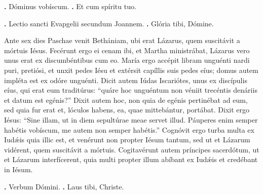 
\textbf{\Vbar.} Dóminus vobíscum.
\textbf{\Rbar.} Et cum spíritu tuo.

\textbf{\Vbar.} Lectio sancti Evapgelii secundum Joannem.
\textbf{\Rbar.} Glória tibi, Dómine.

Ante sex dies Paschae venit Bethániam, ubi erat Lázarus, quem suscitávit a mórtuis Iésus. Fecérunt ergo ei cenam ibi, et Martha ministrábat, Lázarus vero unus erat ex discumbéntibus cum eo. María ergo accépit libram unguénti nardi puri, pretiósi, et unxit pedes Iésu et extérsit capíllis suis pedes eíus; domus autem impléta est ex odóre unguénti. Dicit autem Iúdas Iscariótes, unus ex discípulis eíus, qui erat eum traditúrus: “quáre hoc unguéntum non véniit trecéntis denáriis et datum est egénis?” Dixit autem hoc, non quia de egénis pertinébat ad eum, sed quia fur erat et, lóculos habens, ea, quae mittebántur, portábat. Dixit ergo Iésus: “Sine illam, ut in diem sepultúrae meae servet illud. Páuperes enim semper habétis vobíscum, me autem non semper habétis.” Cognóvit ergo turba multa ex Iudǽis quia illic est, et venérunt non propter Iésum tantum, sed ut et Lázarum vidérent, quem suscitávit a mórtuis. Cogitavérunt autem príncipes sacerdótum, ut et Lázarum interfícerent, quia multi propter illum abíbant ex Iudǽis et credébant in Iésum.

\textbf{\Vbar.} Verbum Dómini.
\textbf{\Rbar.} Laus tibi, Christe.
\par
